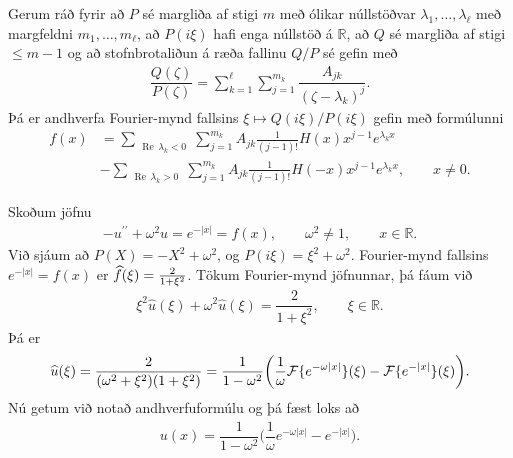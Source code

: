 \documentclass[a4paper,10pt,icelandic]{sphinxmanual}
\begin{document}
Gerum ráð fyrir að \(P\) sé margliða af stigi \(m\) með ólikar núllstöðvar \(\lambda_1, \dots, \lambda_{\ell}\) með margfeldni \(m_1, \dots, m_{\ell}\), að \(P(i\xi)\) hafi enga núllstöð á \(\mathbb{R}\), að \(Q\) sé margliða af stigi \(\le m-1\) og að stofnbrotaliðun á ræða fallinu \(Q/P\) sé gefin með
\begin{equation*}
\begin{split}\dfrac {Q(\zeta)}{P({\zeta})} =\sum\limits_{k=1}^\ell
\sum\limits_{j=1}^{m_k} \dfrac{A_{jk}}{({\zeta}-{\lambda}_k)^j}.\end{split}
\end{equation*}
Þá er andhverfa Fourier-mynd fallsins \({\xi}\mapsto Q(i\xi)/P(i{\xi})\) gefin með formúlunni
\begin{equation*}
\begin{split}f(x)&=
\sum_{\substack{{{\operatorname{Re\, }}}{\lambda}_k<0}}
\sum\limits_{j=1}^{m_k} A_{jk}
\tfrac 1{(j-1)!}H(x)x^{j-1}e^{{\lambda}_kx}\\
&-\sum_{\substack{{{\operatorname{Re\, }}}{\lambda}_k>0}}
\sum\limits_{j=1}^{m_k} A_{jk} \tfrac 1{(j-1)!} H(-x)x^{j-1}e^{{\lambda}_kx},
\qquad x\neq 0.\nonumber\end{split}
\end{equation*}

Skoðum jöfnu
\begin{equation*}
\begin{split}-u{{^{\prime\prime}}}+\omega^ 2u=e^{-|x|}=f(x), \qquad \omega^ 2 \neq 1,
\qquad x\in {{\mathbb  R}}.\end{split}
\end{equation*}
Við sjáum að \(P(X)=-X^2+\omega^2\), og \(P(i\xi)=\xi^2+\omega^2\). Fourier-mynd fallsins \(e^{-|x|}=f(x)\) er \(\widehat f(\xi)={2 \over 1+\xi^ 2}\). Tökum Fourier-mynd jöfnunnar, þá fáum við
\begin{equation*}
\begin{split}\xi^ 2 \widehat u(\xi)+\omega^ 2 \widehat u(\xi) = \dfrac
2{1+\xi^ 2}, \qquad \xi\in {{\mathbb  R}}.\end{split}
\end{equation*}
Þá er
\begin{equation*}
\begin{split}\widehat u(\xi)=
\dfrac 2{(\omega^ 2+\xi^ 2)(1+\xi^ 2)} =\dfrac 1{1-\omega^ 2}\bigg(
\dfrac 1\omega {{\cal F}}\{e^{-\omega|x|}\}({\xi})-{{\cal F}}\{e^{-|x|}\}({\xi})
\bigg).\end{split}
\end{equation*}
Nú getum við notað andhverfuformúlu og þá fæst loks að
\begin{equation*}
\begin{split}u(x)= \dfrac 1{1-\omega^ 2}\bigg( \dfrac 1\omega e^{-\omega|x|} - e^{-|x|} \bigg).\end{split}
\end{equation*}
\end{document}
